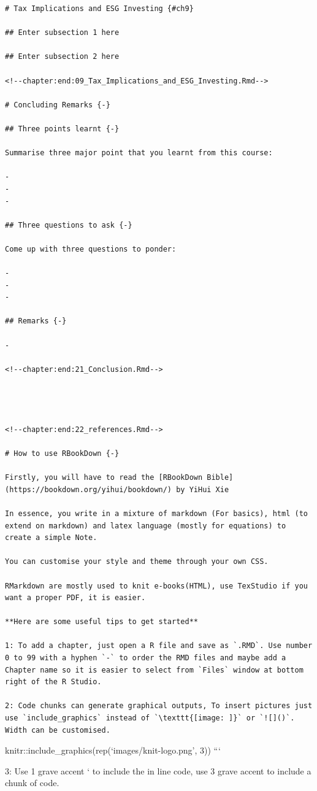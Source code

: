 \documentclass[
]{book}
\begin{document}
\begin{verbatim}
# Tax Implications and ESG Investing {#ch9}

## Enter subsection 1 here

## Enter subsection 2 here

<!--chapter:end:09_Tax_Implications_and_ESG_Investing.Rmd-->

# Concluding Remarks {-}

## Three points learnt {-}

Summarise three major point that you learnt from this course:

- 
- 
- 

## Three questions to ask {-}

Come up with three questions to ponder:

- 
-
-

## Remarks {-}

-

<!--chapter:end:21_Conclusion.Rmd-->




<!--chapter:end:22_references.Rmd-->

# How to use RBookDown {-}

Firstly, you will have to read the [RBookDown Bible](https://bookdown.org/yihui/bookdown/) by YiHui Xie

In essence, you write in a mixture of markdown (For basics), html (to extend on markdown) and latex language (mostly for equations) to create a simple Note.

You can customise your style and theme through your own CSS. 

RMarkdown are mostly used to knit e-books(HTML), use TexStudio if you want a proper PDF, it is easier.

**Here are some useful tips to get started**

1: To add a chapter, just open a R file and save as `.RMD`. Use number 0 to 99 with a hyphen `-` to order the RMD files and maybe add a Chapter name so it is easier to select from `Files` window at bottom right of the R Studio. 

2: Code chunks can generate graphical outputs, To insert pictures just use `include_graphics` instead of `\texttt{[image: ]}` or `![]()`. Width can be customised. 

\end{verbatim}

knitr::include\_graphics(rep(`images/knit-logo.png', 3))
```

3: Use 1 grave accent ` to include the in line code, use 3 grave accent to include a chunk of code.

  
\end{document}
